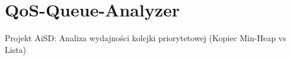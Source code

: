 \chapter{Qo\+S-\/\+Queue-\/\+Analyzer }
\hypertarget{md__r_e_a_d_m_e}{}\label{md__r_e_a_d_m_e}
\label{md__r_e_a_d_m_e_autotoc_md0}%
%


Projekt Ai\+SD:\+ Analiza wydajności kolejki priorytetowej (Kopiec Min-\/\+Heap vs Lista) 